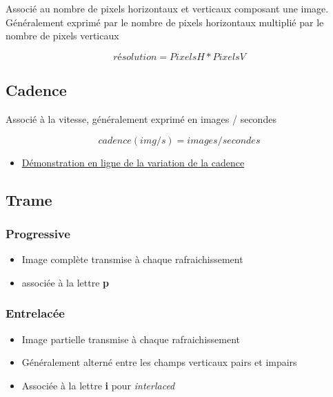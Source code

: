 \documentclass[
  french,
]{book}
\providecommand{\tightlist}{%
  \setlength{\itemsep}{0pt}\setlength{\parskip}{0pt}}
\begin{document}
Associé au nombre de pixels horizontaux et verticaux composant une image.
Généralement exprimé par le nombre de pixels horizontaux multiplié par le nombre de pixels verticaux

\[
résolution  = PixelsH * PixelsV 
\]

\hypertarget{cadence}{%
\subsection{Cadence}\label{cadence}}

Associé à la vitesse, généralement exprimé en images / secondes

\[
cadence (img/s) = images / secondes
\]

\begin{itemize}
\tightlist
\item
  \href{https://frames-per-second.appspot.com}{Démonstration en ligne de la variation de la cadence}
\end{itemize}

\hypertarget{trame}{%
\subsection{Trame}\label{trame}}

\hypertarget{progressive}{%
\subsubsection{Progressive}\label{progressive}}

\begin{itemize}
\tightlist
\item
  Image complète transmise à chaque rafraichissement
\item
  associée à la lettre \textbf{p}
\end{itemize}

\hypertarget{entrelacuxe9e}{%
\subsubsection{Entrelacée}\label{entrelacuxe9e}}

\begin{itemize}
\tightlist
\item
  Image partielle transmise à chaque rafraichissement
\item
  Généralement alterné entre les champs verticaux pairs et impairs
\item
  Associée à la lettre \textbf{i} pour \emph{interlaced}
\end{itemize}
\end{document}
